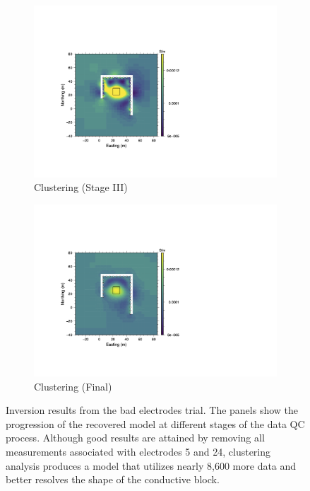\documentclass[final,authoryear,5p,times,twocolumn]{elsarticle}
\begin{document}
\begin{figure}[!ht]
   \vspace{1em}

   \begin{subfigure}[b]{0.475\linewidth}
       \centering
       \includegraphics[trim=3.35cm 3.6cm 11.95cm 5.4cm, clip=true, width=\linewidth]{./Figures/Fig21c.png}
       \caption{Clustering (Stage III)}
       \label{fig:Synth_Horseshoe_BadElec_Clust}
   \end{subfigure}
   \hfill
   \begin{subfigure}[b]{0.475\linewidth}
       \centering
       \includegraphics[trim=3.35cm 3.6cm 11.95cm 5.4cm, clip=true, width=\linewidth]{./Figures/Fig21d.png}
       \caption{Clustering (Final)}
       \label{fig:Synth_Horseshoe_BadElec_ClustFinal}
   \end{subfigure}

   \caption{Inversion results from the bad electrodes trial. The panels show the progression of the recovered model at different stages of the data QC process. Although good results are attained by removing all measurements associated with electrodes 5 and 24, clustering analysis produces a model that utilizes nearly 8,600 more data and better resolves the shape of the conductive block.}
   \label{fig:Synth_Horseshoe_BadElec}
\end{figure}
\end{document}
